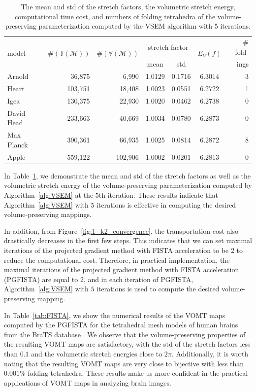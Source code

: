\documentclass[onefignum,onetabnum]{siamonline220329}
\numberwithin{equation}{section}
\begin{document}
\begin{sloppypar}
\begin{table}[]
\centering
\caption{The mean and std of the stretch factors, the volumetric stretch energy, computational time cost, and numbers of folding tetrahedra of the volume-preserving parameterization computed by the VSEM algorithm with 5 iterations.}
\label{tab:VSEM}
\begin{tabular}{lrrcccr}
\hline
\multirow{2}{*}{model}& \multirow{2}{*}{$\#(\mathbb{T}(\mathcal{M}))$} & \multirow{2}{*}{$\#(\mathbb{V}(\mathcal{M}))$} &  \multicolumn{2}{c}{stretch factor}  & \multirow{2}{*}{$E_V(f)$} & \# fold- \\
  &  &  &  mean  & std &  &  ings  \\ \hline
Arnold     &  36,875 &   6,990 & 1.0129 & 0.1716 & 6.3014 & 3 \\ 
Heart      & 103,751 &  18,408 & 1.0023 & 0.0551 & 6.2722 & 1 \\ 
Igea       & 130,375 &  22,930 & 1.0020 & 0.0462 & 6.2738 & 0 \\ 
David Head & 233,663 &  40,669 & 1.0034 & 0.0780 & 6.2873 &  0 \\ 
Max Planck & 390,361 &  66,935 & 1.0025 & 0.0814 & 6.2872 &  8 \\ 
Apple      & 559,122 & 102,906 & 1.0002 & 0.0201 & 6.2813 &  0 \\ \hline
\end{tabular}
\end{table}

In Table~\ref{tab:VSEM}, we demonstrate the mean and std of the stretch factors as well as the volumetric stretch energy of the volume-preserving parameterization computed by Algorithm~\ref{alg:VSEM} at the $5$th iteration. These results indicate that Algorithm~\ref{alg:VSEM} with $5$ iterations is effective in computing the desired volume-preserving mappings.

In addition, from Figure~\ref{fig:1_k2_convergence}, the transportation cost also drastically decreases in the first few steps. This indicates that we can set maximal iterations of the projected gradient method with FISTA acceleration to be $2$ to reduce the computational cost. Therefore, in practical implementation, the maximal iterations of the projected gradient method with FISTA acceleration (PGFISTA) are equal to $2$, and in each iteration of PGFISTA, Algorithm~\ref{alg:VSEM} with $5$ iterations is used to compute the desired volume-preserving mapping.

In Table~\ref{tab:FISTA}, we show the numerical results of the VOMT maps computed by the PGFISTA for the tetrahedral mesh models of human brains from the BraTS database \cite{BaAS17,BaGB21}.
We observe that the volume-preserving properties of the resulting VOMT maps are satisfactory, with the std of the stretch factors less than $0.1$ and the volumetric stretch energies close to $2\pi$. Additionally, it is worth noting that the resulting VOMT maps are very close to bijective with less than $0.001\%$ folding tetrahedra. These results make us more confident in the practical applications of VOMT maps in analyzing brain images.


\end{sloppypar}
\end{document}
